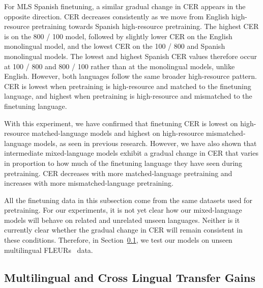 For MLS Spanish finetuning, a similar gradual change in CER appears in the opposite direction. CER decreases consistently as we move from English high-resource pretraining towards Spanish high-resource pretraining. The highest CER is on the 800 / 100 model, followed by slightly lower CER on the English monolingual model, and the lowest CER on the 100 / 800 and Spanish monolingual models. The lowest and highest Spanish CER values therefore occur at 100 / 800 and 800 / 100 rather than at the monolingual models, unlike English. However, both languages follow the same broader high-resource pattern. CER is lowest when pretraining is high-resource and matched to the finetuning language, and highest when pretraining is high-resource and mismatched to the finetuning language.

With this experiment, we have confirmed that finetuning CER is lowest on high-resource matched-language models and highest on high-resource mismatched-language models, as seen in previous research\cite{ashihara2023exploration, poncelet2021comparison, zhang2023fast, gupta2021clsril}. However, we have also shown that intermediate mixed-language models exhibit a gradual change in CER that varies in proportion to how much of the finetuning language they have seen during pretraining. CER decreases with more matched-language pretraining and increases with more mismatched-language pretraining. 

All the finetuning data in this subsection come from the same datasets used for pretraining. For our experiments, it is not yet clear how our mixed-language models will behave on related and unrelated unseen languages. Neither is it currently clear whether the gradual change in CER will remain consistent in these conditions. Therefore, in Section~\ref{ed_subsec:gain_across_languages}, we test our models on unseen multilingual FLEURs~\cite{FLEURS} data.


\subsection{Multilingual and Cross Lingual Transfer Gains}\label{ed_subsec:gain_across_languages}



